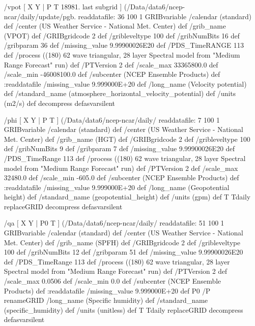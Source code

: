 \begin{ingrid}
  /vpot { [ X Y | P T 18981. last subgrid ] (/Data/data6/ncep-ncar/daily/update/pgb.%
  readdatafile:
  36 100 1 GRIBvariable
  /calendar (standard) def
  /center (US Weather Service - National Met. Center) def
  /grib_name (VPOT) def
  /GRIBgridcode 2 def
  /gribleveltype 100 def
  /gribNumBits 16 def
  /gribparam 36 def
  /missing_value 9.99900026E20 def
  /PDS_TimeRANGE 113 def
  /process ((180) 62 wave triangular, 28 layer Spectral model from "Medium Range Forecast" run) def
  /PTVersion 2 def
  /scale_max 33365800.0 def
  /scale_min -46008100.0 def
  /subcenter (NCEP Ensemble Products) def
  :readdatafile
  /missing_value 9.999000E+20 def
  /long_name (Velocity potential) def
  /standard_name (atmosphere_horizontal_velocity_potential) def
  /units (m2/s) def
  decompress
  } defasvarsilent

  /phi { [ X Y | P T ] (/Data/data6/ncep-ncar/daily/%
  readdatafile:
  7 100 1 GRIBvariable
  /calendar (standard) def
  /center (US Weather Service - National Met. Center) def
  /grib_name (HGT) def
  /GRIBgridcode 2 def
  /gribleveltype 100 def
  /gribNumBits 9 def
  /gribparam 7 def
  /missing_value 9.99900026E20 def
  /PDS_TimeRange 113 def
  /process ((180) 62 wave triangular, 28 layer Spectral model from "Medium Range Forecast" run) def
  /PTVersion 2 def
  /scale_max 32480.0 def
  /scale_min -605.0 def
  /subcenter (NCEP Ensemble Products) def
  :readdatafile
  /missing_value 9.999000E+20 def
  /long_name (Geopotential height) def
  /standard_name (geopotential_height) def
  /units (gpm) def
T Tdaily replaceGRID 
  decompress
  } defasvarsilent

  /qa { [ X Y | P0 T ] (/Data/data6/ncep-ncar/daily/%
  readdatafile:
  51 100 1 GRIBvariable
  /calendar (standard) def
  /center (US Weather Service - National Met. Center) def
  /grib_name (SPFH) def
  /GRIBgridcode 2 def
  /gribleveltype 100 def
  /gribNumBits 12 def
  /gribparam 51 def
  /missing_value 9.99900026E20 def
  /PDS_TimeRange 113 def
  /process ((180) 62 wave triangular, 28 layer Spectral model from "Medium Range Forecast" run) def
  /PTVersion 2 def
  /scale_max 0.0506 def
  /scale_min 0.0 def
  /subcenter (NCEP Ensemble Products) def
  :readdatafile
  /missing_value 9.999000E+20 def
  P0 /P renameGRID
  /long_name (Specific humidity) def
  /standard_name (specific_humidity) def
  /units (unitless) def
T Tdaily replaceGRID 
  decompress 
  } defasvarsilent


\end{ingrid}
